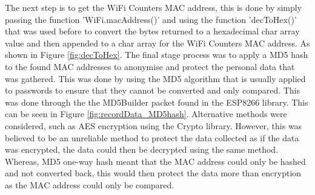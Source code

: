 \documentclass{report}
\begin{document}
The next step is to get the WiFi Counters MAC address, this is done by simply passing the function 'WiFi.macAddress()'\cite{wifMACaddress} and using the function 'decToHex()' that was used before to convert the bytes returned to a hexadecimal char array value and then appended to a char array for the WiFi Counters MAC address. As shown in Figure \ref{fig:decToHex}. The final stage process was to apply a MD5 hash to the found MAC addresses to anonymise and protect the personal data that was gathered. This was done by using the MD5 algorithm\cite{MD5} that is usually applied to passwords to ensure that they cannot be converted and only compared. This was done through the the MD5Builder\cite{MD5Builder} packet found in the ESP8266 library. This can be seen in Figure \ref{fig:recordData_MD5hash}. Alternative methods were considered, such as AES encryption using the Crypto\cite{AESEncryption} library. However, this was believed to be an unreliable method to protect the data collected as if the data was encrypted, the data could then be decrypted using the same method. Whereas, MD5 one-way hash meant that the MAC address could only be hashed and not converted back, this would then protect the data more than encryption as the MAC address could only be compared. \\ \newline
\end{document}
